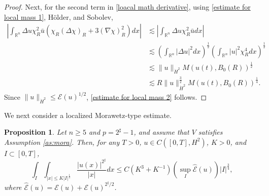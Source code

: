 \documentclass[11pt,a4paper]{article}
\numberwithin{equation}{section}
\newtheorem{proposition}[theorem]{Proposition}
\begin{document}
\begin{proof}
Next, for the second term in \eqref{loacal math derivative}, using \eqref{estimate for local mass 1}, H\"older, and Sobolev,
\begin{align*}
\left|\int_{\mathbb{R}^{n}} \Delta u\chi_{R}^{2}\bar{u}\left( \chi_{R} (\Delta \chi)_{R} + 3(\nabla \chi)_{R}^{2}\right) dx\right|
&\lesssim \left| \int_{\mathbb{R}^{n}} \Delta u \chi_{R}^{2} \bar{u} dx \right| \\
&\lesssim \left( \int_{\mathbb{R}^{n}} |\Delta u|^{2}dx \right)^{\frac{1}{2}} \left(\int_{\mathbb{R}^{n}} |u|^{2}\chi_{R}^{4}dx \right)^{\frac{1}{2}} \\
&\lesssim \|u\|_{\dot{H}^{2}}M(u(t), B_{0}(R))^{\frac{1}{2}} \\
&\lesssim R\|u\|_{\dot{H}^{2}}^{\frac{3}{2}}M(u(t), B_{0}(R))^{\frac{1}{4}}.
\end{align*}
Since $\|u\|_{\dot{H}^{2}} \leq \mathcal{E}(u)^{1/2}$, \eqref{estimate for local mass 2} follows.
\end{proof}

We next consider a localized Morawetz-type estimate.

\begin{proposition}
Let $n \geq 5$ and $p = 2^{\sharp} - 1$, and assume that $V$ satisfies Assumption \ref{as:mora}.
Then, for any $T > 0$, $u \in C([0, T], H^{2})$, $K > 0$, and $I \subset [0, T]$,
\begin{equation}\label{Morawetz}
\int_{I}\int_{|x| \leq K|I|^{\frac{1}{4}}} \dfrac{|u(x)|^{2^{\sharp}}}{|x|}dx \leq C(K^{3} + K^{-1})\left( \sup_{I} \hat{\mathcal{E}}(u) \right)|I|^{\frac{3}{4}},
\end{equation}
where $\hat{\mathcal{E}}(u) = \mathcal{E}(u) + \mathcal{E}(u)^{2^{\sharp}/2}$.
\end{proposition}
\end{document}
